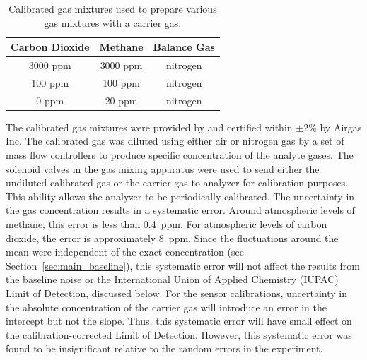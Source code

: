 \documentclass[preprint,sort&compress]{elsarticle}
\begin{document}
			\begin{table}[!t]
				\caption{Calibrated gas mixtures used to prepare various gas mixtures with a carrier gas.}
				\label{tab:ratios}
				\small
				\centering
					\begin{tabular}{c | c | c}
						Carbon Dioxide & Methane  & Balance Gas \\ \hline
						3000 ppm       & 3000 ppm & nitrogen    \\
						100 ppm        & 100 ppm  & nitrogen    \\
						0 ppm          & 20 ppm   & nitrogen
					\end{tabular} 
				\end{table}
				
				The calibrated gas mixtures were provided by and certified within $\pm$2\% by Airgas Inc.  The calibrated gas was diluted using either air or nitrogen gas by a set of mass flow controllers to produce specific concentration of the analyte gases.  The solenoid valves in the gas mixing apparatus were used to send either the undiluted calibrated gas or the carrier gas to analyzer for calibration purposes.  This ability allows the analyzer to be periodically calibrated.  The uncertainty in the gas concentration results in a systematic error.  Around atmospheric levels of methane, this error is less than 0.4~ppm.  For atmospheric levels of carbon dioxide, the error is approximately 8~ppm.  Since the fluctuations around the mean were independent of the exact concentration (see Section~\ref{sec:main_baseline}), this systematic error will not affect the results from the baseline noise or the International Union of Applied Chemistry (IUPAC) Limit of Detection, discussed below.  For the sensor calibrations, uncertainty in the absolute concentration of the carrier gas will introduce an error in the intercept but not the slope.  Thus, this systematic error will have small effect on the calibration-corrected Limit of Detection.  However, this systematic error was found to be insignificant relative to the random errors in the experiment.  
			
\end{document}
